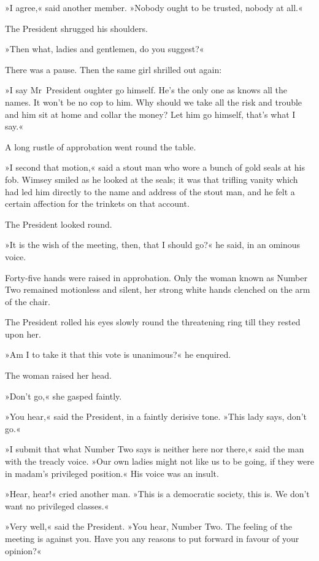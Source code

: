 »I agree,« said another member. »Nobody ought to be trusted, nobody at all.«

The President shrugged his shoulders.

»Then what, ladies and gentlemen, do you suggest?«

There was a pause. Then the same girl shrilled out again:

»I say Mr~President oughter go himself. He's the only one as knows all the names. It won't be no cop to him. Why should we take all the risk and trouble and him sit at home and collar the money? Let him go himself, that's what I say.«

A long rustle of approbation went round the table.

»I second that motion,« said a stout man who wore a bunch of gold seals at his fob. Wimsey smiled as he looked at the seals; it was that trifling vanity which had led him directly to the name and address of the stout man, and he felt a certain affection for the trinkets on that account.

The President looked round.

»It is the wish of the meeting, then, that I should go?« he said, in an ominous voice.

Forty-five hands were raised in approbation. Only the woman known as Number Two remained motionless and silent, her strong white hands clenched on the arm of the chair.

The President rolled his eyes slowly round the threatening ring till they rested upon her.

»Am I to take it that this vote is unanimous?« he enquired.

The woman raised her head.

»Don't go,« she gasped faintly.

»You hear,« said the President, in a faintly derisive tone. »This lady says, don't go.«

»I submit that what Number Two says is neither here nor there,« said the man with the treacly voice. »Our own ladies might not like us to be going, if they were in madam's privileged position.« His voice was an insult.

»Hear, hear!« cried another man. »This is a democratic society, this is. We don't want no privileged classes.«

»Very well,« said the President. »You hear, Number Two. The feeling of the meeting is against you. Have you any reasons to put forward in favour of your opinion?«

